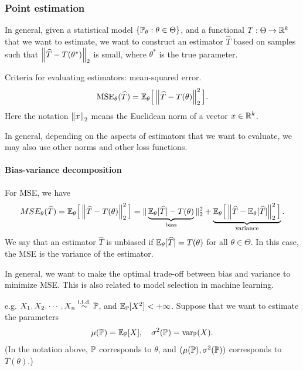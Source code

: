 \documentclass[11pt,letterpaper]{article}
\numberwithin{theorem}{lecture}
\numberwithin{proposition}{lecture}
\numberwithin{lemma}{lecture}
\numberwithin{claim}{lecture}
\numberwithin{corollary}{lecture}
\numberwithin{definition}{lecture}
\numberwithin{conjecture}{lecture}
\numberwithin{remark}{lecture}
\numberwithin{example}{lecture}
\numberwithin{equation}{lecture}
\begin{document}
\subsubsection{Point estimation}
In general, given a statistical model $\{{\mathbb{P}}_\theta: \theta \in \Theta\}$, and a functional $T: \Theta \to \mathbb{R}^k$ that we want to estimate, we want to construct an estimator $\widehat{T}$ based on samples such that $\left\| \widehat{T} - T(\theta^*)\right\|_{2}$ is small, where $\theta^*$ is the true parameter.

Criteria for evaluating estimators: mean-squared error.
\begin{align*}
  \text{MSE}_\theta (\widehat{T}) = {\mathbb{E}}_\theta \Big[\left\| \widehat{T} - T(\theta)\right\|_{2}^2 \Big].
\end{align*}
Here the notation $\left\| x\right\|_{2}$ means the Euclidean norm of a vector $x \in \mathbb{R}^k$.

In general, depending on the aspects of estimators that we want to evaluate, we may also use other norms and other loss functions.

\paragraph{Bias-variance decomposition} For MSE, we have
\begin{align*}
  MSE_\theta (\widehat{T}) = {\mathbb{E}}_\theta \Big[\left\| \widehat{T} - T(\theta)\right\|_{2}^2 \Big] = \Vert \underbrace{{\mathbb{E}}_\theta[\widehat{T}] - T(\theta)}_{\mathrm{bias}}\Vert_{2}^2 + \underbrace{{\mathbb{E}}_\theta \Big[\left\| \widehat{T} - {\mathbb{E}}_\theta[\widehat{T}]\right\|_{2}^2\Big]}_{\mathrm{variance}}.
\end{align*}
We say that an estimator $\widehat{T}$ is unbiased if ${\mathbb{E}}_\theta[\widehat{T}] = T(\theta)$ for all $\theta \in \Theta$. In this case, the MSE is the variance of the estimator.

In general, we want to make the optimal trade-off between bias and variance to minimize MSE. This is also related to model selection in machine learning.

e.g. $X_1, X_2, \cdots, X_n \overset{\mathrm{i.i.d.}}{\sim} {\mathbb{P}}$, and ${\mathbb{E}}_{{\mathbb{P}}} [X^2] < + \infty$. Suppose that we want to estimate the parameters
\begin{align*}
\mu ({\mathbb{P}}) = {\mathbb{E}}_{{\mathbb{P}}}[X], \quad \sigma^2 ({\mathbb{P}}) = \operatorname{var}_{{\mathbb{P}}}(X).
\end{align*}
(In the notation above, ${\mathbb{P}}$ corresponds to $\theta$, and $(\mu({\mathbb{P}}), \sigma^2({\mathbb{P}}))$ corresponds to $T(\theta)$.)
\end{document}

